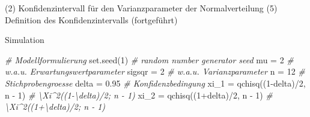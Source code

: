 \documentclass[
  8pt,
  ignorenonframetext,
]{beamer}
\newenvironment{Shaded}{\begin{snugshade}}{\end{snugshade}}
\newcommand{\CommentTok}[1]{\textcolor[rgb]{0.56,0.35,0.01}{\textit{#1}}}
\newcommand{\DecValTok}[1]{\textcolor[rgb]{0.00,0.00,0.81}{#1}}
\newcommand{\FloatTok}[1]{\textcolor[rgb]{0.00,0.00,0.81}{#1}}
\newcommand{\FunctionTok}[1]{\textcolor[rgb]{0.00,0.00,0.00}{#1}}
\newcommand{\NormalTok}[1]{#1}
\newcommand{\OtherTok}[1]{\textcolor[rgb]{0.56,0.35,0.01}{#1}}
\newcommand{\SpecialCharTok}[1]{\textcolor[rgb]{0.00,0.00,0.00}{#1}}
\begin{document}
\begin{frame}[fragile]{(2) Konfidenzintervall für den Varianzparameter
der Normalverteilung}
\protect\hypertarget{konfidenzintervall-fuxfcr-den-varianzparameter-der-normalverteilung-5}{}
\noindent(5) Definition des Konfidenzintervalls (fortgeführt)

\small

Simulation \vspace{2mm}

\footnotesize

\begin{Shaded}
\begin{Highlighting}[]
\CommentTok{\# Modellformulierung}
\FunctionTok{set.seed}\NormalTok{(}\DecValTok{1}\NormalTok{)                                 }\CommentTok{\# random number generator seed}
\NormalTok{mu      }\OtherTok{=} \DecValTok{2}                                 \CommentTok{\# w.a.u. Erwartungswertparameter}
\NormalTok{sigsqr  }\OtherTok{=} \DecValTok{2}                                 \CommentTok{\# w.a.u. Varianzparameter}
\NormalTok{n       }\OtherTok{=} \DecValTok{12}                                \CommentTok{\# Stichprobengroesse}
\NormalTok{delta   }\OtherTok{=} \FloatTok{0.95}                              \CommentTok{\# Konfidenzbedingung}
\NormalTok{xi\_1    }\OtherTok{=} \FunctionTok{qchisq}\NormalTok{((}\DecValTok{1}\SpecialCharTok{{-}}\NormalTok{delta)}\SpecialCharTok{/}\DecValTok{2}\NormalTok{, n }\SpecialCharTok{{-}} \DecValTok{1}\NormalTok{)        }\CommentTok{\# \textbackslash{}Xi\^{}2((1{-}\textbackslash{}delta)/2; n {-} 1)}
\NormalTok{xi\_2    }\OtherTok{=} \FunctionTok{qchisq}\NormalTok{((}\DecValTok{1}\SpecialCharTok{+}\NormalTok{delta)}\SpecialCharTok{/}\DecValTok{2}\NormalTok{, n }\SpecialCharTok{{-}} \DecValTok{1}\NormalTok{)        }\CommentTok{\# \textbackslash{}Xi\^{}2((1+\textbackslash{}delta)/2; n {-} 1)}


\end{Highlighting}
\end{Shaded}
\end{frame}
\end{document}
